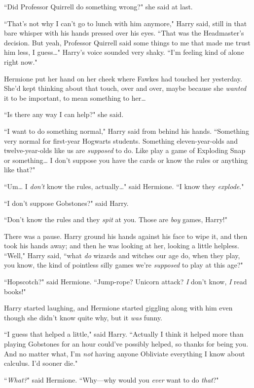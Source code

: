 ``Did Professor Quirrell do something wrong?" she said at last.

``That's not why I can't go to lunch with him anymore," Harry said, still in that bare whisper with his hands pressed over his eyes. ``That was the Headmaster's decision. But yeah, Professor Quirrell said some things to me that made me trust him less, I guess{\ldots}" Harry's voice sounded very shaky. ``I'm feeling kind of alone right now."

Hermione put her hand on her cheek where Fawkes had touched her yesterday. She'd kept thinking about that touch, over and over, maybe because she \emph{wanted} it to be important, to mean something to her{\ldots}

``Is there any way I can help?" she said.

``I want to do something normal," Harry said from behind his hands. ``Something very normal for first-year Hogwarts students. Something eleven-year-olds and twelve-year-olds like us are \emph{supposed} to do. Like play a game of Exploding Snap or something{\ldots} I don't suppose you have the cards or know the rules or anything like that?"

``Um{\ldots} I \emph{don't} know the rules, actually{\ldots}" said Hermione. ``I know they \emph{explode}."

``I don't suppose Gobstones?" said Harry.

``Don't know the rules and they \emph{spit} at you. Those are \emph{boy} games, Harry!"

There was a pause. Harry ground his hands against his face to wipe it, and then took his hands away; and then he was looking at her, looking a little helpless. ``Well," Harry said, ``what \emph{do} wizards and witches our age do, when they play, you know, the kind of pointless silly games we're \emph{supposed} to play at this age?"

``Hopscotch?" said Hermione. ``Jump-rope? Unicorn attack? \emph{I} don't know, \emph{I} read books!"

Harry started laughing, and Hermione started giggling along with him even though she didn't know quite why, but it \emph{was} funny.

``I guess that helped a little," said Harry. ``Actually I think it helped more than playing Gobstones for an hour could've possibly helped, so thanks for being you. And no matter what, I'm \emph{not} having anyone Obliviate everything I know about calculus. I'd sooner die."

``\emph{What?}" said Hermione. ``Why---why would you \emph{ever} want to do \emph{that}?"

